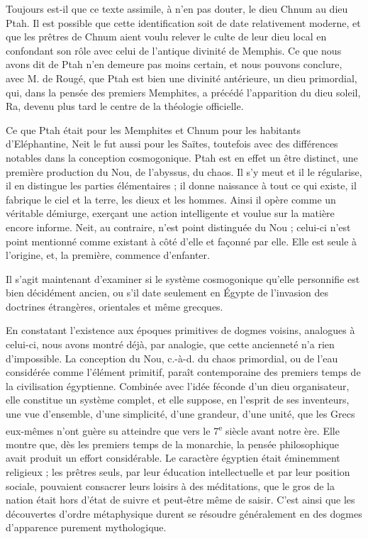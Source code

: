 \documentclass[a4paper, 11pt, oneside]{article}
\begin{document}
Toujours est-il que ce texte assimile, à n'en pas douter, le dieu Chnum au dieu Ptah. Il est possible que cette identification soit de date relativement moderne, et que les prêtres de Chnum aient voulu relever le culte de leur dieu local en confondant son rôle avec celui de l'antique divinité de Memphis. Ce que nous avons dit de Ptah n'en demeure pas moins certain, et nous pouvons conclure, avec M. de Rougé, que Ptah est bien une divinité antérieure, un dieu primordial, qui, dans la pensée des premiers Memphites, a précédé l'apparition du dieu soleil, Ra, devenu plus tard le centre de la théologie officielle.

Ce que Ptah était pour les Memphites et Chnum pour les habitants d'Eléphantine, Neit le fut aussi pour les Saïtes, toutefois avec des différences notables dans la conception cosmogonique. Ptah est en effet un être distinct, une première production du Nou, de l'abyssus, du chaos. Il s'y meut et il le régularise, il en distingue les parties élémentaires ; il donne naissance à tout ce qui existe, il fabrique le ciel et la terre, les dieux et les hommes. Ainsi il opère comme un véritable démiurge, exerçant une action intelligente et voulue sur la matière encore informe. Neit, au contraire, n'est point distinguée du Nou ; celui-ci n'est point mentionné comme existant à côté d'elle et façonné par elle. Elle est seule à l'origine, et, la première, commence d'enfanter.

Il s'agit maintenant d'examiner si le système cosmogonique qu'elle personnifie est bien décidément ancien, ou s'il date seulement en Égypte de l'invasion des doctrines étrangères, orientales et même grecques.

En constatant l'existence aux époques primitives de dogmes voisins, analogues à celui-ci, nous avons montré déjà, par analogie, que cette ancienneté n'a rien d'impossible. La conception du Nou, c.-à-d. du chaos primordial, ou de l'eau considérée comme l'élément primitif, paraît contemporaine des premiers temps de la civilisation égyptienne. Combinée avec l'idée féconde d'un dieu organisateur, elle constitue un système complet, et elle suppose, en l'esprit de ses inventeurs, une vue d'ensemble, d'une simplicité, d'une grandeur, d'une unité, que les Grecs eux-mêmes n'ont guère su atteindre que vers le 7\textsuperscript{e} siècle avant notre ère. Elle montre que, dès les premiers temps de la monarchie, la pensée philosophique avait produit un effort considérable. Le caractère égyptien était éminemment religieux ; les prêtres seuls, par leur éducation intellectuelle et par leur position sociale, pouvaient consacrer leurs loisirs à des méditations, que le gros de la nation était hors d'état de suivre et peut-être même de saisir. C'est ainsi que les découvertes d'ordre métaphysique durent se résoudre généralement en des dogmes d'apparence purement mythologique.
\end{document}
